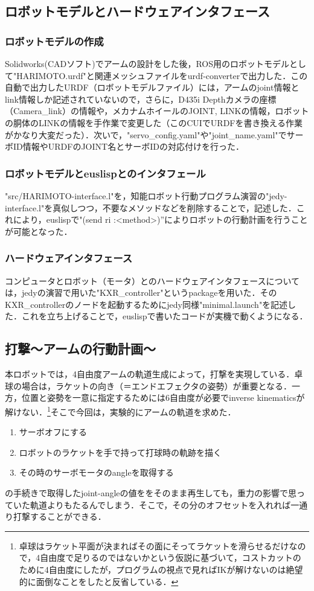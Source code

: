 \documentclass[10pt, oneside, titlepage]{ltjarticle}  %
\begin{document}
  \subsection{ロボットモデルとハードウェアインタフェース}
    \subsubsection{ロボットモデルの作成}
    Solidworks(CADソフト)でアームの設計をした後，ROS用のロボットモデルとして"HARIMOTO.urdf"と関連メッシュファイルをurdf-converterで出力した．この自動で出力したURDF（ロボットモデルファイル）には，アームのjoint情報とlink情報しか記述されていないので，さらに，D435i Depthカメラの座標（Camera\_link）の情報や，メカナムホイールのJOINT, LINKの情報，ロボットの胴体のLINKの情報を手作業で変更した（このCUIでURDFを書き換える作業がかなり大変だった）．次いで，"servo\_config.yaml"や"joint\_name.yaml"でサーボID情報やURDFのJOINT名とサーボIDの対応付けを行った．

    \subsubsection{ロボットモデルとeuslispとのインタフェール}
    "src/HARIMOTO-interface.l"を，知能ロボット行動プログラム演習の"jedy-interface.l"を真似しつつ，不要なメソッドなどを削除することで，記述した．これにより，euslispで"(send ri :<method>)”によりロボットの行動計画を行うことが可能となった．
    \subsubsection{ハードウェアインタフェース}
    コンピュータとロボット（モータ）とのハードウェアインタフェースについては，jedyの演習で用いた"KXR\_controller"というpackageを用いた．そのKXR\_controllerのノードを起動するためにjedy同様"minimal.launch"を記述した．これを立ち上げることで，euslispで書いたコードが実機で動くようになる．

    \subsection{打撃〜アームの行動計画〜}
    本ロボットでは，4自由度アームの軌道生成によって，打撃を実現している．卓球の場合は，ラケットの向き（＝エンドエフェクタの姿勢）が重要となる．一方，位置と姿勢を一意に指定するためには6自由度が必要でinverse kinematicsが解けない．\footnote{卓球はラケット平面が決まればその面にそってラケットを滑らせるだけなので，4自由度で足りるのではないかという仮説に基づいて，コストカットのために4自由度にしたが，プログラムの視点で見ればIKが解けないのは絶望的に面倒なことをしたと反省している．}そこで今回は，実験的にアームの軌道を求めた．
    \begin{enumerate}
      \item サーボオフにする
      \item ロボットのラケットを手で持って打球時の軌跡を描く
      \item その時のサーボモータのangleを取得する
    \end{enumerate}
    の手続きで取得したjoint-angleの値ををそのまま再生しても，重力の影響で思っていた軌道よりもたるんでしまう．そこで，その分のオフセットを入れれば一通り打撃することができる．
\end{document}
